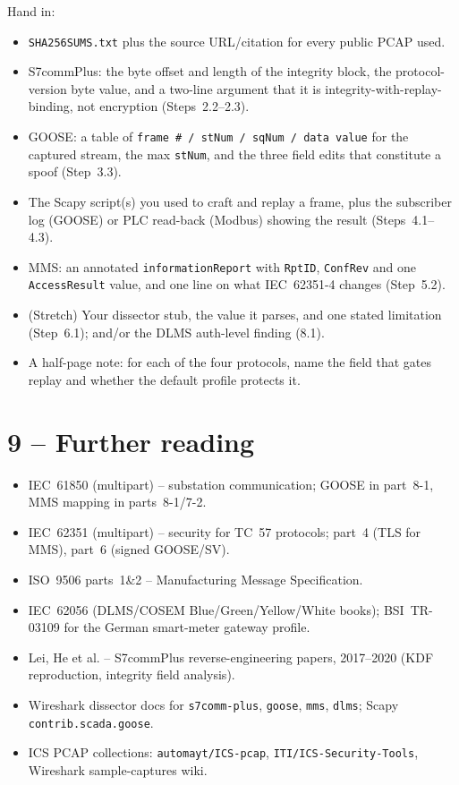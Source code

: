 \documentclass[11pt,a4paper]{article}
\begin{document}
\begin{deliverbox}
Hand in:
\begin{itemize}[leftmargin=*, nosep]
  \item \texttt{SHA256SUMS.txt} plus the source URL/citation for every
        public PCAP used.
  \item S7commPlus: the byte offset and length of the integrity block, the
        protocol-version byte value, and a two-line argument that it is
        integrity-with-replay-binding, not encryption (Steps~2.2--2.3).
  \item GOOSE: a table of \texttt{frame \# / stNum / sqNum / data value}
        for the captured stream, the max \texttt{stNum}, and the three
        field edits that constitute a spoof (Step~3.3).
  \item The Scapy script(s) you used to craft and replay a frame, plus the
        subscriber log (GOOSE) or PLC read-back (Modbus) showing the
        result (Steps~4.1--4.3).
  \item MMS: an annotated \texttt{informationReport} with \texttt{RptID},
        \texttt{ConfRev} and one \texttt{AccessResult} value, and one line
        on what IEC~62351-4 changes (Step~5.2).
  \item (Stretch) Your dissector stub, the value it parses, and one stated
        limitation (Step~6.1); and/or the DLMS auth-level finding (8.1).
  \item A half-page note: for each of the four protocols, name the field
        that gates replay and whether the default profile protects it.
\end{itemize}
\end{deliverbox}

\section*{9 -- Further reading}

\begin{notebox}
\begin{itemize}[leftmargin=*, nosep]
  \item IEC~61850 (multipart) -- substation communication; GOOSE in
        part~8-1, MMS mapping in parts~8-1/7-2.
  \item IEC~62351 (multipart) -- security for TC~57 protocols; part~4
        (TLS for MMS), part~6 (signed GOOSE/SV).
  \item ISO~9506 parts~1\&2 -- Manufacturing Message Specification.
  \item IEC~62056 (DLMS/COSEM Blue/Green/Yellow/White books); BSI~TR-03109
        for the German smart-meter gateway profile.
  \item Lei, He et al. -- S7commPlus reverse-engineering papers,
        2017--2020 (KDF reproduction, integrity field analysis).
  \item Wireshark dissector docs for \texttt{s7comm-plus}, \texttt{goose},
        \texttt{mms}, \texttt{dlms}; Scapy \texttt{contrib.scada.goose}.
  \item ICS PCAP collections: \texttt{automayt/ICS-pcap},
        \texttt{ITI/ICS-Security-Tools}, Wireshark sample-captures wiki.
\end{itemize}
\end{notebox}
\end{document}
